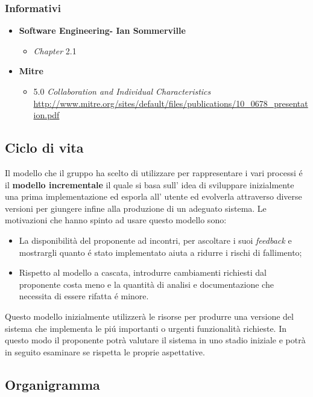 \subsubsection{Informativi}
\begin{itemize}
\item \textbf{Software Engineering- Ian Sommerville}
	\begin{itemize}
	\item \textit{Chapter} 2.1
	\end{itemize}
\item \textbf{Mitre}
	\begin{itemize} 
	\item 5.0 \textit{Collaboration and Individual Characteristics} \url{http://www.mitre.org/sites/default/files/publications/10_0678_presentation.pdf}
	\end{itemize}
\end{itemize}
\subsection{Ciclo di vita}
\label{subsec:ciclodivita}
Il modello che il gruppo \gruppo ha scelto di utilizzare per rappresentare i vari processi \'e il \textbf{modello incrementale} il quale si basa sull' idea di sviluppare inizialmente una prima implementazione ed esporla all' utente ed evolverla attraverso diverse versioni per giungere infine alla produzione di un adeguato sistema. Le motivazioni che hanno spinto ad usare questo modello sono:
\begin{itemize}
	\item La disponibilità del proponente ad incontri, per ascoltare i suoi \textit{feedback} e mostrargli quanto \'e stato implementato aiuta a ridurre i rischi di fallimento;
	\item Rispetto al modello a cascata, introdurre cambiamenti richiesti dal proponente costa meno e la quantità di analisi e documentazione che necessita di essere rifatta \'e minore.
\end{itemize}
Questo modello inizialmente utilizzerà le risorse per produrre una versione del sistema che implementa le pi\'u importanti o urgenti funzionalità richieste. In questo modo il proponente potrà valutare il sistema in uno stadio iniziale e potrà in seguito esaminare se rispetta le proprie aspettative.

\subsection{Organigramma}

